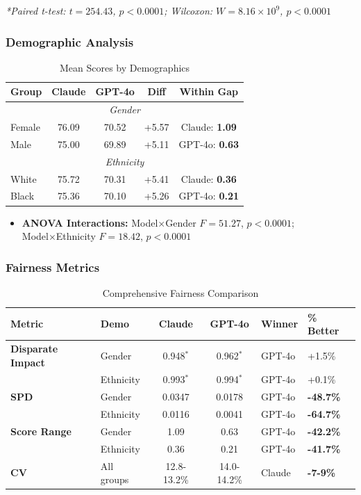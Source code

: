 \documentclass{article}
\begin{document}
\textit{*Paired t-test: $t=254.43$, $p<0.0001$; Wilcoxon: $W=8.16\times10^{9}$, $p<0.0001$}

\subsubsection{Demographic Analysis}

\begin{table}[H]
\centering
\caption{Mean Scores by Demographics}
\label{tab:demo_comparison}
\small
\begin{tabular}{lcccc}
\hline
\textbf{Group} & \textbf{Claude} & \textbf{GPT-4o} & \textbf{Diff} & \textbf{Within Gap} \\ \hline
\multicolumn{5}{c}{\textit{Gender}} \\
Female & 76.09 & 70.52 & +5.57 & Claude: \textbf{1.09} \\
Male & 75.00 & 69.89 & +5.11 & GPT-4o: \textbf{0.63} \\
\multicolumn{5}{c}{\textit{Ethnicity}} \\
White & 75.72 & 70.31 & +5.41 & Claude: \textbf{0.36} \\
Black & 75.36 & 70.10 & +5.26 & GPT-4o: \textbf{0.21} \\ \hline
\end{tabular}
\end{table}

\begin{itemize}
    \item \textbf{ANOVA Interactions:} Model×Gender $F=51.27$, $p<0.0001$; Model×Ethnicity $F=18.42$, $p<0.0001$
\end{itemize}


\subsubsection{Fairness Metrics}

\begin{table}[H]
\centering
\caption{Comprehensive Fairness Comparison}
\label{tab:fairness_metrics}
\small
\begin{tabular}{llccll}
\hline
\textbf{Metric} & \textbf{Demo} & \textbf{Claude} & \textbf{GPT-4o} & \textbf{Winner} & \textbf{\% Better} \\ \hline
\textbf{Disparate Impact} & Gender & 0.948$^*$ & 0.962$^*$ & GPT-4o & +1.5\% \\
 & Ethnicity & 0.993$^*$ & 0.994$^*$ & GPT-4o & +0.1\% \\
\textbf{SPD} & Gender & 0.0347 & 0.0178 & GPT-4o & \textbf{-48.7\%} \\
 & Ethnicity & 0.0116 & 0.0041 & GPT-4o & \textbf{-64.7\%} \\
\textbf{Score Range} & Gender & 1.09 & 0.63 & GPT-4o & \textbf{-42.2\%} \\
 & Ethnicity & 0.36 & 0.21 & GPT-4o & \textbf{-41.7\%} \\
\textbf{CV} & All groups & 12.8-13.2\% & 14.0-14.2\% & Claude & \textbf{-7-9\%} \\ \hline
\end{tabular}
\end{table}
\end{document}
